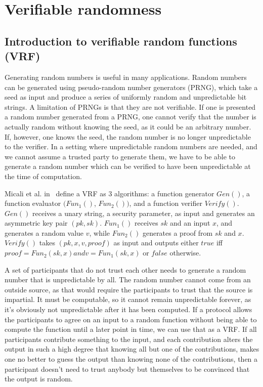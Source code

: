 \section{Verifiable randomness}
\label{sec:vrf}

\subsection{Introduction to verifiable random functions (VRF)}

Generating random numbers is useful in many applications. Random numbers can be generated using pseudo-random number generators (PRNG), which take a seed as input and produce a series of uniformly random and unpredictable bit strings. A limitation of PRNGs is that they are not verifiable. If one is presented a random number generated from a PRNG, one cannot verify that the number is actually random without knowing the seed, as it could be an arbitrary number. If, however, one knows the seed, the random number is no longer unpredictable to the verifier. In a setting where unpredictable random numbers are needed, and we cannot assume a trusted party to generate them, we have to be able to generate a random number which can be verified to have been unpredictable at the time of computation.

Micali et al. in~\cite{micali_verifiable_1999} define a VRF as 3 algorithms: a function generator $Gen()$, a function evaluator $(Fun_1()$, $Fun_2())$, and a function verifier $Verify()$. $Gen()$ receives a unary string, a security parameter, as input and generates an asymmetric key pair $(pk, sk)$. $Fun_1()$ receives $sk$ and an input $x$, and generates a random value $v$, while $Fun_2()$ generates a proof from $sk$ and $x$. $Verify()$ takes $(pk, x, v, proof)$ as input and outputs either $true$ iff $proof=Fun_2(sk, x) and v=Fun_1(sk, x)$ or $false$ otherwise.

A set of participants that do not trust each other needs to generate a random number that is unpredictable by all. The random number cannot come from an outside source, as that would require the participants to trust that the source is impartial. It must be computable, so it cannot remain unpredictable forever, as it's obviously not unpredictable after it has been computed. If a protocol allows the participants to agree on an input to a random function without being able to compute the function until a later point in time, we can use that as a VRF. If all participants contribute something to the input, and each contribution alters the output in such a high degree that knowing all but one of the contributions, makes one no better to guess the output than knowing none of the contributions, then a participant doesn't need to trust anybody but themselves to be convinced that the output is random.


